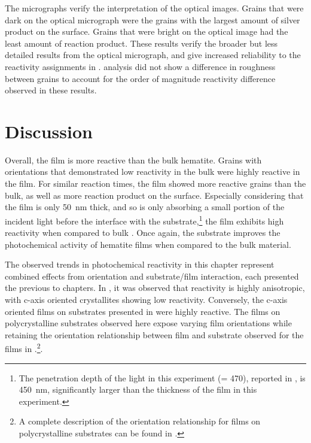 The  micrographs verify the interpretation of the optical images. Grains that were dark on the optical micrograph were the grains with the largest amount of silver product on the surface. Grains that were bright on the optical image had the least amount of reaction product. These results verify the broader but less detailed results from the optical micrograph, and give increased reliability to the reactivity assignments in .  analysis did not show a difference in roughness between grains to account for the order of magnitude reactivity difference observed in these results.


\section{Discussion}
\label{sec:poly.reac.discussion}


Overall, the film is more reactive than the bulk hematite. Grains with orientations that demonstrated low reactivity in the bulk were highly reactive in the film. For similar reaction times, the film showed more reactive grains than the bulk, as well as more reaction product on the surface. Especially considering that the film is only \SI{50}{\nano\meter} thick, and so is only absorbing a small portion of the incident light before the interface with the substrate,\footnote{The penetration depth of the light in this experiment (\textlambda = \si{470}{\nano\meter}), reported in , is \texttildelow\SI{450}{\nano\meter}, significantly larger than the thickness of the film in this experiment.} the film exhibits high reactivity when compared to bulk . Once again, the  substrate improves the photochemical activity of hematite films when compared to the bulk material.

The observed trends in photochemical reactivity in this chapter represent combined effects from  orientation and substrate/film interaction, each presented the previous to chapters. In , it was observed that  reactivity is highly anisotropic, with c-axis oriented crystallites showing low reactivity. Conversely, the c-axis oriented films on  substrates presented in  were highly reactive. The films on polycrystalline substrates observed here expose varying film orientations while retaining the orientation relationship between film and substrate observed for the films in .\footnote{A complete description of the orientation relationship for  films on polycrystalline  substrates can be found in .}.

